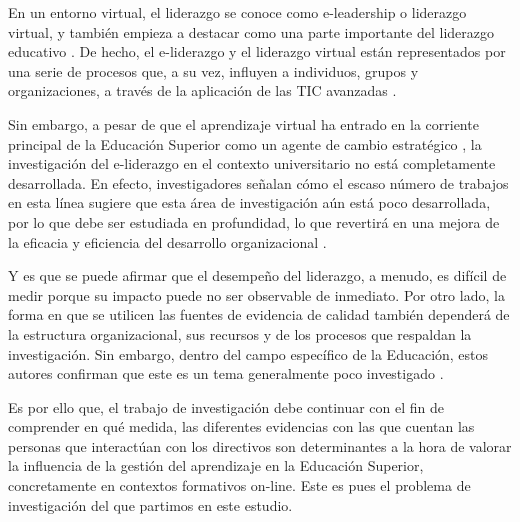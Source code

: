 \documentclass[spanish]{textolivre}
\begin{document}
En un entorno virtual, el liderazgo se conoce como e-leadership o liderazgo virtual, y también empieza a destacar como una parte importante del liderazgo educativo \cite{ehlers2020digital}. De hecho, el e-liderazgo y el liderazgo virtual están representados por una serie de procesos que, a su vez, influyen a individuos, grupos y organizaciones, a través de la aplicación de las TIC avanzadas \cite{jones2017}.

Sin embargo, a pesar de que el aprendizaje virtual ha entrado en la corriente principal de la Educación Superior como un agente de cambio estratégico \cite{miller2020leading}, la investigación del e-liderazgo en el contexto universitario no está completamente desarrollada. En efecto, investigadores señalan cómo el escaso número de trabajos en esta línea sugiere que esta área de investigación aún está poco desarrollada, por lo que debe ser estudiada en profundidad, lo que revertirá en una mejora de la eficacia y eficiencia del desarrollo organizacional \cite{palomino2023b}.

Y es que se puede afirmar que el desempeño del liderazgo, a menudo, es difícil de medir porque su impacto puede no ser observable de inmediato. Por otro lado, la forma en que se utilicen las fuentes de evidencia de calidad también dependerá de la estructura organizacional, sus recursos y de los procesos que respaldan la investigación. Sin embargo, dentro del campo específico de la Educación, estos autores confirman que este es un tema generalmente poco investigado \cite{rickinson_framework_2022}.

Es por ello que, el trabajo de investigación debe continuar con el fin de comprender en qué medida, las diferentes evidencias con las que cuentan las personas que interactúan con los directivos son determinantes a la hora de valorar la influencia de la gestión del aprendizaje en la Educación Superior, concretamente en contextos formativos on-line. Este es pues el problema de investigación del que partimos en este estudio.
\end{document}
